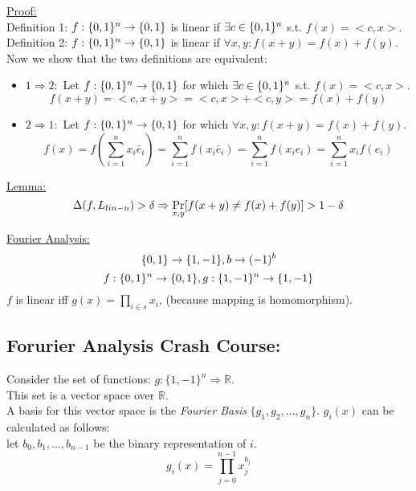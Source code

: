 \underline{Proof:}\\
Definition 1: $f:\{0,1\}^n\rightarrow \{0,1\}$ is
linear if $\exists c\in\{0,1\}^n$ s.t. $f(x)=<c,x>$.\\
Definition 2: $f:\{0,1\}^n\rightarrow \{0,1\}$ is
linear if $\forall x,y: f(x+y)=f(x)+f(y)$.\\
Now we show that the two definitions are equivalent:\\
\begin{itemize}
	\item $1\Rightarrow 2:$
	Let $f:\{0,1\}^n\rightarrow \{0,1\}$ for which  $\exists c\in\{0,1\}^n$ s.t. $f(x)=<c,x>$.\\
	\[
		f(x+y)=<c,x+y>=<c,x>+<c,y>=f(x)+f(y)	
	\]
	\item $2\Rightarrow 1:$
	Let $f:\{0,1\}^n\rightarrow \{0,1\}$ for which $\forall x,y: f(x+y)=f(x)+f(y)$.\\
	\[
		f(x)=f(\sum_{i=1}^n x_i\bar{e}_i)=\sum_{i=1}^n f(x_i\bar{e}_i)
		=\sum_{i=1}^n f(x_ie_i)
		=\sum_{i=1}^nx_if(e_i)%
	\]
\end{itemize}

\underline{Lemma:}\\
\[
	\Delta(f,L_{lin-n})>\delta
	\Rightarrow \operatorname*{Pr}_{x,y}[f(x+y)\neq f(x)+f(y)]>1-\delta
\]

\underline{Fourier Analysis:}\\
\[
	\{0,1\}\rightarrow \{1,-1\}, b\rightarrow (-1)^b
\]\[
	f:\{0,1\}^n\rightarrow \{0,1\}, g:\{1,-1\}^n\rightarrow \{1,-1\}
\]
$f$ is linear iff $g(x)=\prod_{i\in s}x_i$, 
(because mapping is homomorphism).

\subsection*{Forurier Analysis Crash Course:}
Consider the set of functions: $g:\{1,-1\}^n\Rightarrow\mathbb{R}$.\\
This set is a vector space over $\mathbb{R}$.\\
A basis for this vector space is the \emph{Fourier Basis} $\{g_1,g_2,...,g_n\}$.
$g_i(x)$ can be calculated as follows:\\
let $b_0,b_1,...,b_{n-1}$ be the binary representation of $i$.\\
\[
	g_i(x)=\prod_{j=0}^{n-1}x_j^{b_j}
\]